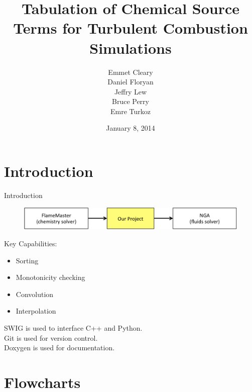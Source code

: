 \documentclass{beamer}
\title[APC 524 Design Review]{Tabulation of Chemical Source Terms for Turbulent Combustion Simulations}
\author{Emmet Cleary \\
Daniel Floryan \\
Jeffry Lew \\
Bruce Perry \\
Emre Turkoz}
\date{January 8, 2014}
\begin{document}
\begin{frame}
  \titlepage
\end{frame}


\section{Introduction}
\begin{frame}{Introduction}
\begin{figure}
\includegraphics[width=\textwidth]{scope.pdf}
\end{figure}
\vskip 5mm
Key Capabilities:
\begin{itemize}
\item Sorting
\item Monotonicity checking
\item Convolution
\item Interpolation
\end{itemize}
\vspace{12pt}
SWIG is used to interface C++ and Python.\\
Git is used for version control.\\
Doxygen is used for documentation.
\end{frame}


\section{Flowcharts}
\end{document}
